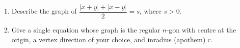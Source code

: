 \begin{enumerate}
\item[(a)] Describe the graph of $\dfrac{|x+y|+|x-y|}{2}=s$, where $s>0$.
\item[(b)] Give a single equation whose graph is the regular $n$-gon with centre at the origin, a vertex direction of your choice, and inradius (apothem) $r$.
\end{enumerate}
